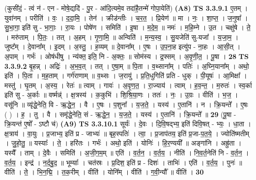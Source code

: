 \documentclass[17pt]{extarticle}
\begin{document}
                      (कुसी॑दं॒ - त्वं न॑ - एन - मोषे॒द्यदि॑ - पु॒र - आ॑दि॒त्यमे॒व तदा॑है॒तन्मे॑ गोपा॒येति॑)  \textbf{(A8)} \newline \newline
                                \textbf{ TS 3.3.9.1} \newline
                  ए॒तम् । युवा॑नम् । परीति॑ । वः॒ । द॒दा॒मि॒ । तेन॑ । क्रीड॑न्तीः । च॒र॒त॒ । प्रि॒येण॑ ॥ मा । नः॒ । शा॒प्त॒ । ज॒नुषा᳚ । सु॒भा॒गा॒ इति॑ सु - भा॒गाः॒ । रा॒यः । पोषे॑ण । समिति॑ । इ॒षा । म॒दे॒म॒ ॥ नमः॑ । म॒हि॒म्ने । उ॒त । चक्षु॑षे । ते॒ । मरु॑ताम् । पि॒तः॒ । तत् । अ॒हम् । गृ॒णा॒मि॒ ॥ अन्विति॑ । म॒न्य॒स्व॒ । सु॒यजेति॑ सु-यजा᳚ । य॒जा॒म॒ । जुष्ट᳚म् । दे॒वाना᳚म् । इ॒दम् । अ॒स्तु॒ । ह॒व्यम् ॥ दे॒वाना᳚म् । ए॒षः । उ॒प॒ना॒ह इत्यु॑प - ना॒हः । आ॒सी॒त् । अ॒पाम् । गर्भः॑ । ओष॑धीषु । न्य॑क्त॒ इति॒ नि - अ॒क्तः॒ ॥ सोम॑स्य । द्र॒फ्सम् । अ॒वृ॒णी॒त॒ । पू॒षा । \textbf{  28} \newline
                  \newline
                                \textbf{ TS 3.3.9.2} \newline
                  बृ॒हन्न् । अद्रिः॑ । अ॒भ॒व॒त् । तत् । ए॒षा॒म् ॥ पि॒ता । व॒थ्साना᳚म् । पतिः॑ । अ॒घ्नि॒याना᳚म् । अथो॒ इति॑ । पि॒ता । म॒ह॒ताम् । गर्ग॑राणाम् ॥ व॒थ्सः । ज॒रायु॑ । प्र॒ति॒धुगिति॑ प्रति - धुक् । पी॒यूषः॑ । आ॒मिक्षा᳚ । मस्तु॑ । घृ॒तम् । अ॒स्य॒ । रेतः॑ ॥ त्वाम् । गावः॑ । अ॒वृ॒ण॒त॒ । रा॒ज्याय॑ । त्वाम् । ह॒व॒न्त॒ । म॒रुतः॑ । स्व॒र्का इति॑ सु - अ॒र्काः ॥ वर्ष्मन्न्॑ । क्ष॒त्रस्य॑ । क॒कुभि॑ । शि॒श्रि॒या॒णः । ततः॑ । नः॒ । उ॒ग्रः । वीति॑ । भ॒ज॒ । वसू॑नि ॥ व्यृ॑द्धे॒नेति॒ वि - ऋ॒द्धे॒न॒ । वै । ए॒षः । प॒शुना᳚ । य॒ज॒ते॒ । यस्य॑ । ए॒तानि॑ । न । क्रि॒यन्ते᳚ । ए॒षः ( ) । ह॒ । तु । वै । समृ॑द्धे॒नेति॒ सं - ऋ॒द्धे॒न॒ । य॒ज॒ते॒ । यस्य॑ । ए॒तानि॑ । क्रि॒यन्ते᳚ ॥ \textbf{  29} \newline
                  \newline
                      (पू॒षा - क्रि॒यन्त॑ ए॒षो᳚ - ऽष्टौ च॑)  \textbf{(A9)} \newline \newline
                                \textbf{ TS 3.3.10.1} \newline
                  सूर्यः॑ । दे॒वः । दि॒वि॒षद्भ्य॒ इति॑ दिवि॒षत् - भ्यः॒ । धा॒ता । क्ष॒त्राय॑ । वा॒युः । प्र॒जाभ्य॒ इति॑ प्र - जाभ्यः॑ ॥ बृह॒स्पतिः॑ । त्वा॒ । प्र॒जाप॑तय॒ इति॑ प्र॒जा-प॒त॒ये॒ । ज्योति॑ष्मतीम् । जु॒हो॒तु॒ ॥ यस्याः᳚ । ते॒ । हरि॑तः । गर्भः॑ । अथो॒ इति॑ । योनिः॑ । हि॒र॒ण्ययी᳚ ॥ अङ्गा॑नि । अह्रु॑ता । यस्यै᳚ । ताम् । दे॒वैः । समिति॑ । अ॒जी॒ग॒म॒म् ॥ एति॑ । व॒र्त॒न॒ । व॒र्त॒य॒ । नीति॑ । नि॒व॒र्त॒नेति॑ नि - व॒र्त॒न॒ । व॒र्त॒य॒ । इन्द्र॑ । न॒र्द॒बु॒द॒ ॥ भूम्याः᳚ । चत॑स्रः । प्र॒दिश॒ इति॑ प्र - दिशः॑ । ताभिः॑ । एति॑ । व॒र्त॒य॒ । पुनः॑ ॥ वीति॑ । ते॒ । भि॒न॒द्मि॒ । त॒क॒रीम् । वीति॑ । योनि᳚म् । वीति॑ । ग॒वी॒न्यौ᳚ ॥ वीति॑ । \textbf{  30} \newline
\end{document}

